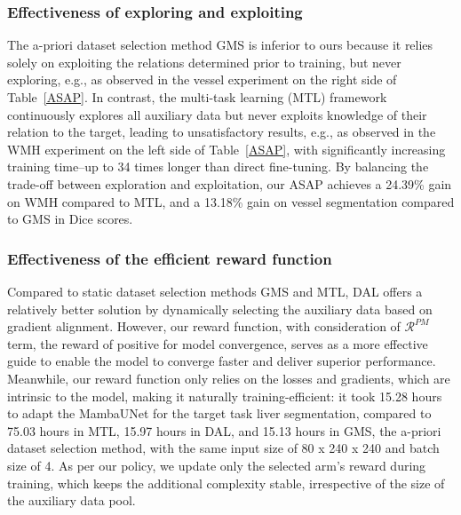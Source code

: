 \vspace{-0.4cm}
\subsubsection{Effectiveness of exploring and exploiting}
\vspace{-0.1cm}
The a-priori dataset selection method GMS is inferior to ours because it relies solely on exploiting the relations determined prior to training, but never exploring, e.g., as observed in the vessel experiment on the right side of Table~\ref{ASAP}.
In contrast, the multi-task learning (MTL) framework continuously explores all auxiliary data but never exploits knowledge of their relation to the target, leading to unsatisfactory results, e.g., as observed in the WMH experiment on the left side of Table~\ref{ASAP}, with significantly increasing training time--up to 34 times longer than direct fine-tuning.
By balancing the trade-off between exploration and exploitation, our ASAP achieves a 24.39\% gain on WMH compared to MTL, and a 13.18\% gain on vessel segmentation compared to GMS in Dice scores.
\vspace{-0.4cm}
\subsubsection{Effectiveness of the efficient reward function}
\vspace{-0.2cm}
Compared to static dataset selection methods GMS and MTL, DAL offers a relatively better solution by dynamically selecting the auxiliary data based on gradient alignment.
However, our reward function, with consideration of $\mathcal{R}^{PM}$ term, the reward of positive for model convergence, serves as a more effective guide to enable the model to 
converge faster and 
deliver superior performance.
Meanwhile, our reward function only relies on the losses and gradients, which are intrinsic to the model, making it naturally training-efficient: it took 15.28 hours to adapt the MambaUNet for the target task liver segmentation, compared to 75.03 hours in MTL, 15.97 hours in DAL, and 15.13 hours in GMS, the a-priori dataset selection method, with the same input size of 80 x 240 x 240 and batch size of 4.
As per our policy, we update only the selected arm's reward during training, which keeps the additional complexity stable, irrespective of the size of the auxiliary data pool. 
% 
% 

